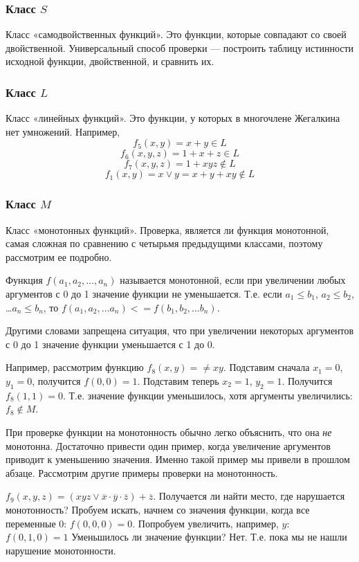 \documentclass{article}
\renewcommand{\lor}{\vee}
\renewcommand{\land}{\cdot}
\newcommand{\xor}{+}
\newcommand{\lne}[1]{\overline{#1}}
\begin{document}
    \subsubsection{Класс $S$}
    Класс «самодвойственных функций». Это функции, которые совпадают со своей двойственной. Универсальный способ проверки — построить таблицу истинности исходной функции, двойственной, и сравнить их.
    \subsubsection{Класс $L$}
    Класс «линейных функций». Это функции, у которых в многочлене Жегалкина нет умножений. Например,
    \[f_5(x, y) = x + y \in L\]
    \[f_6(x, y, z) = 1 + x + z \in L\]
    \[f_7(x, y, z) = 1 + xyz \notin L\]
    \[f_1(x, y) = x \lor y = x + y + xy \notin L\]
    \subsubsection{Класс $M$}
    Класс «монотонных функций».
    Проверка, является ли функция монотонной, самая сложная по сравнению с четырьмя предыдущими классами, поэтому рассмотрим ее подробно.

    Функция $f(a_1, a_2, \ldots, a_n)$ называется монотонной, если при увеличении любых аргументов с 0 до 1 значение функции не уменьшается. Т.е. если $a_1\le b_1$, $a_2\le b_2$, \ldots  $a_n\le b_n$, то
    $f(a_1, a_2, \ldots a_n) <= f(b_1, b_2, \ldots b_n)$.

    Другими словами запрещена ситуация, что при увеличении некоторых аргументов с 0 до 1 значение функции уменьшается с 1 до 0.

    Например, рассмотрим функцию $f_8(x, y) = \ne{xy}$. Подставим сначала $x_1=0$, $y_1=0$, получится $f(0, 0)=1$.
    Подставим теперь $x_2=1$, $y_2=1$. Получится $f_8(1, 1)=0$. Т.е. значение функции уменьшилось, хотя аргументы увеличились: $f_8 \notin M$.

    При проверке функции на монотонность обычно легко объяснить, что она \emph{не} монотонна.
    Достаточно привести один пример, когда увеличение аргументов приводит к уменьшению значения.
    Именно такой пример мы привели в прошлом абзаце. Рассмотрим другие примеры проверки на монотонность.

    $f_9(x, y, z)=(xyz \lor \lne x\land\lne y\land\lne z) \xor \lne z$. Получается ли найти место, где нарушается
    монотонность? Пробуем искать, начнем со значения функции, когда все переменные 0: $f(0, 0, 0)=0$.
    Попробуем увеличить, например, $y$: $f(0, 1, 0)=1$ Уменьшилось ли значение функции? Нет.
    Т.е. пока мы не нашли нарушение монотонности.
\end{document}
